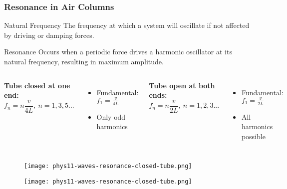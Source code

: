 \documentclass{beamer}
\begin{document}
\begin{frame}
\frametitle{Resonance in Air Columns}
\begin{block}{Natural Frequency}
The frequency at which a system will oscillate if not affected by driving or damping forces.
\end{block}

\begin{block}{Resonance}
Occurs when a periodic force drives a harmonic oscillator at its natural frequency, resulting in maximum amplitude.
\end{block}

\begin{columns}
\textbf{Tube closed at one end:}
\begin{equation}
f_n = n\frac{v}{4L}, \: n = 1,3,5...
\end{equation}
\begin{itemize}
\item Fundamental: $f_1 = \frac{v}{4L}$
\item Only odd harmonics
\end{itemize}

\textbf{Tube open at both ends:}
\begin{equation}
f_n = n\frac{v}{2L}, \: n = 1,2,3...
\end{equation}
\begin{itemize}
\item Fundamental: $f_1 = \frac{v}{2L}$
\item All harmonics possible
\end{itemize}


\end{columns}
\end{frame}

\begin{frame}{}
    
\begin{figure}
    \centering
    \texttt{[image: phys11-waves-resonance-closed-tube.png]}
\end{figure}

\end{frame}
\begin{frame}{}
    
\begin{figure}
    \centering
    \texttt{[image: phys11-waves-resonance-closed-tube.png]}
\end{figure}
\end{frame}
\end{document}
